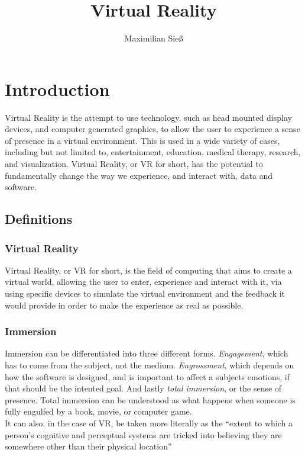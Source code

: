\documentclass[11pt]{report}
\begin{document}
\title{Virtual Reality}
\author{Maximilian Sieß}
\maketitle

\tableofcontents


\chapter{Introduction}
Virtual Reality is the attempt to use technology, such as head mounted display devices, and computer generated graphics, to allow the user to experience a sense of presence in a virtual environment.  This is used in a wide variety of cases, including but not limited to, entertainment, education, medical therapy, research, and visualization. Virtual Reality, or VR for short, has the potential to fundamentally change the way we experience, and interact with, data and software.

	\section{Definitions}
		\subsection{Virtual Reality}
			Virtual Reality, or VR for short, is the field of computing that aims to create a virtual world, allowing the user to enter, experience and interact with it, via using specific devices to simulate the virtual environment and the feedback it would provide in order to make the experience as real as possible.
			\cite{boas13}
			
		\subsection{Immersion}
			Immersion can be differentiated into three different forms. \textit{Engagement}, which has to come from the subject, not the medium. \textit{Engrossment}, which depends on how the software is designed, and is important to affect a subjects emotions, if that should be the intented goal. And lastly \textit{total immersion}, or the sense of presence. Total immersion can be understood as what happens when someone is fully engulfed by a book, movie, or computer game. \cite{Brown:2004:GIG:985921.986048} \\
			It can also, in the case of VR, be taken more literally as the “extent to which a person’s cognitive and perceptual systems are tricked into believing they are somewhere other than their physical location” \cite{Patrick:2000:ULP:332040.332479}
\end{document}
